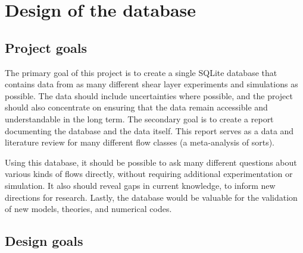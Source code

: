 %
\chapter{Design of the database}
\label{chp:design}


\section{Project goals}

The primary goal of this project is to create a single SQLite database that
contains data from as many different shear layer experiments and simulations as
possible.  The data should include uncertainties where possible, and the
project should also concentrate on ensuring that the data remain accessible and
understandable in the long term.  The secondary goal is to create a report
documenting the database and the data itself.  This report serves as a data and
literature review for many different flow classes (a meta-analysis of sorts).

Using this database, it should be possible to ask many different questions
about various kinds of flows directly, without requiring additional
experimentation or simulation.  It also should reveal gaps in current
knowledge, to inform new directions for research.  Lastly, the database would
be valuable for the validation of new models, theories, and numerical codes.


\section{Design goals}


